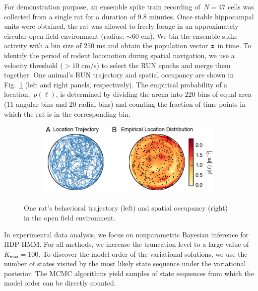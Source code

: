 For demonstration purpose, an ensemble spike train recording
of~${N=47}$ cells was collected from a single rat for a duration of
$9.8$ minutes.  Once stable hippocampal units were obtained, the rat was
allowed to freely forage in an approximately circular open field
environment (radius: $\sim60$ cm).  We bin the ensemble spike activity
with a bin size of $250$ ms and obtain the population vector $\boldsymbol{z}$ in
time.  To identify the period of rodent locomotion during spatial
navigation, we use a velocity threshold ($>10$ cm/s) to select the RUN
epochs and merge them together.  One animal's RUN trajectory and
spatial occupancy are shown in Fig.~\ref{fig4} (left and right panels,
respectively). The empirical probability of a location,~${p(\ell)}$,
is determined by dividing the arena into $220$ bins of equal area ($11$
angular bins and $20$ radial bins) and counting the fraction of time
points in which the rat is in the corresponding bin.

\begin{figure}
\centering
\begin{subfigure}[t]{\textwidth}
\centering
\includegraphics[width=4in]{figures/ch7/Fig4}
\end{subfigure}
\caption[Trajectory of the freely foraging rat during hippocampal
  recording]{One rat's behavioral trajectory (left) and spatial
  occupancy (right) in the open field environment. }
\label{fig4}
\end{figure}

In experimental data analysis, we focus on nonparametric Bayesian
inference for HDP-HMM.  For all methods, we increase the truncation
level to a large value of $K_{\mathsf{max}}=100$.  To discover the model order of the
variational solutions, we use the number of states visited by the most
likely state sequence under the variational posterior. The MCMC
algorithms yield samples of state sequences from which the model order
can be directly counted.


